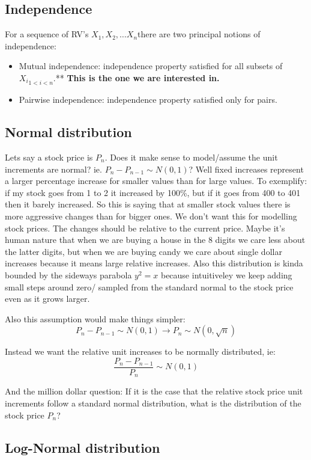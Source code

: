 \documentclass{article}
\begin{document}
\subsection{Independence}
For a sequence of RV's $X_1, X_2, \dots X_n$there are two principal notions of independence: 
\begin{itemize}
\item Mutual independence: independence property satisfied for all subsets of ${X_i}_{1<i<n}$.** \textbf{This is the one we are interested in.}
\item Pairwise independence: independence property satisfied only for pairs.
\end{itemize}

\subsection{Normal distribution}
Lets say a stock price is $P_n$. Does it make sense to model/assume the unit increments are normal? ie. $P_n-P_{n-1} \sim N(0,1)$?  Well fixed increases represent a larger percentage increase for smaller values than for large values. To exemplify: if my stock goes from 1 to 2 it increased by 100\%, but if it goes from 400 to 401 then it barely increased. So this is saying that at smaller stock values there is more aggressive changes than for bigger ones. We don't want this for modelling stock prices. The changes should be relative to the current price. Maybe it's human nature that when we are buying a house in the 8 digits we care less about the latter digits, but when we are buying candy we care about single dollar increases because it means large relative increases. Also this distribution is kinda bounded by the sideways parabola $y^2=x$ because intuitiveley we keep adding small steps around zero/ sampled from the standard normal to the stock price even as it grows larger. 

Also this assumption would make things simpler:
\[ P_n-P_{n-1} \sim N(0,1)  \rightarrow P_n \sim N(0, \sqrt{n})\]

Instead we want the relative unit increases to be normally distributed, ie:
\[ \frac{P_n-P_{n-1}}{P_n} \sim N(0,1)\]

And the million dollar question: If it is the case that the relative stock price unit increments follow a standard normal distribution, what is the distribution of the stock price $P_n$?

\subsection{Log-Normal distribution}
\end{document}
